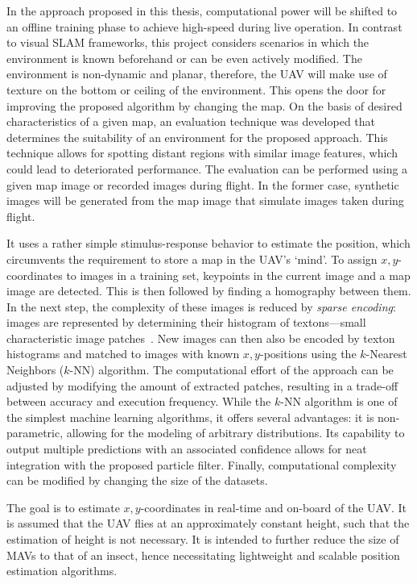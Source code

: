 \documentclass{report}
\begin{document}
In the approach proposed in this thesis, computational power will be
shifted to an offline training phase to achieve high-speed during live
operation. In contrast to visual SLAM frameworks, this project
considers scenarios in which the environment is known beforehand or
can be even actively modified. The environment is non-dynamic and
planar, therefore, the UAV will make use of texture on the bottom or
ceiling of the environment. This opens the door for improving the
proposed algorithm by changing the map. On the basis of desired
characteristics of a given map, an evaluation technique was developed
that determines the suitability of an environment for the proposed
approach. This technique allows for spotting distant regions with
similar image features, which could lead to deteriorated
performance. The evaluation can be performed using a given map image
or recorded images during flight. In the former case, synthetic images
will be generated from the map image that simulate images taken during
flight.

It uses a rather simple stimulus-response behavior to estimate the
position, which circumvents the requirement to store a map in the
UAV's `mind'. To assign $x,y$-coordinates to images in a training set,
keypoints in the current image and a map image are detected. This is
then followed by finding a homography between them. In the next step,
the complexity of these images is reduced by \emph{sparse encoding}:
images are represented by determining their histogram of
textons---small characteristic image
patches~\cite{varma2005statistical}.  New images can then also be
encoded by texton histograms and matched to images with known
$x,y$-positions using the $k$-Nearest Neighbors ($k$-NN) algorithm. The
computational effort of the approach can be adjusted by modifying the
amount of extracted patches, resulting in a trade-off between accuracy
and execution frequency. While the $k$-NN algorithm is one of the
simplest machine learning algorithms, it offers several advantages: it
is non-parametric, allowing for the modeling of arbitrary
distributions. Its capability to output multiple predictions with an
associated confidence allows for neat integration with the proposed
particle filter. Finally, computational complexity can be modified by
changing the size of the datasets.

The goal is to estimate $x,y$-coordinates in real-time and on-board of
the UAV. It is assumed that the UAV flies at an approximately constant
height, such that the estimation of height is not necessary.  It is
intended to further reduce the size of MAVs to that of an insect,
hence necessitating lightweight and scalable position estimation
algorithms.
\end{document}
